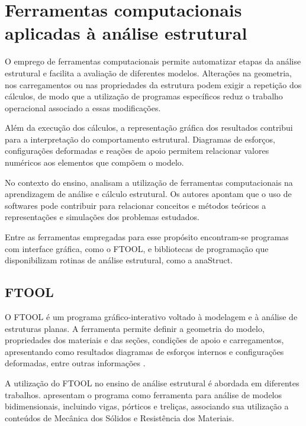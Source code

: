 \section{Ferramentas computacionais aplicadas à análise estrutural}
\label{sec:ferramentas-computacionais}

O emprego de ferramentas computacionais permite automatizar etapas da análise estrutural e facilita a avaliação de diferentes modelos. Alterações na geometria, nos carregamentos ou nas propriedades da estrutura podem exigir a repetição dos cálculos, de modo que a utilização de programas específicos reduz o trabalho operacional associado a essas modificações.

Além da execução dos cálculos, a representação gráfica dos resultados contribui para a interpretação do comportamento estrutural. Diagramas de esforços, configurações deformadas e reações de apoio permitem relacionar valores numéricos aos elementos que compõem o modelo.

No contexto do ensino,  analisam a utilização de ferramentas computacionais na aprendizagem de análise e cálculo estrutural. Os autores apontam que o uso de softwares pode contribuir para relacionar conceitos e métodos teóricos a representações e simulações dos problemas estudados.

Entre as ferramentas empregadas para esse propósito encontram-se programas com interface gráfica, como o \gls{FTOOL}, e bibliotecas de programação que disponibilizam rotinas de análise estrutural, como a anaStruct.

\subsection{FTOOL}
\label{subsec:ftool}

O \gls{FTOOL} é um programa gráfico-interativo voltado à modelagem e à análise de estruturas planas. A ferramenta permite definir a geometria do modelo, propriedades dos materiais e das seções, condições de apoio e carregamentos, apresentando como resultados diagramas de esforços internos e configurações deformadas, entre outras informações \cite{ftoolSobre}.

A utilização do \gls{FTOOL} no ensino de análise estrutural é abordada em diferentes trabalhos.  apresentam o programa como ferramenta para análise de modelos bidimensionais, incluindo vigas, pórticos e treliças, associando sua utilização a conteúdos de Mecânica dos Sólidos e Resistência dos Materiais.

